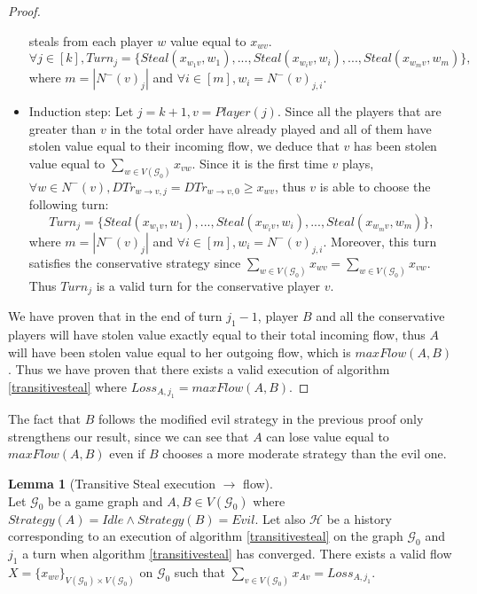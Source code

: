 \documentclass[11pt]{article}
\theoremstyle{definition}
\theoremstyle{corollary}
\theoremstyle{lemma}
\newtheorem{lemma}{Lemma}[section]
\begin{document}
\begin{proof}
\begin{itemize}
          steals from each player $w$ value equal to $x_{wv}$. $$\forall j \in [k], Turn_j = \{Steal(x_{w_1v}, w_1), ...,
          Steal(x_{w_iv}, w_i), ..., Steal(x_{w_mv}, w_m)\},$$ where $m = |N^{-}(v)_j|$ and $\forall i \in [m], w_i =
          N^{-}(v)_{j, i}$.
          \item Induction step: Let $j = k + 1, v = Player(j)$. Since all the players that are greater than $v$ in the total
          order have already played and all of them have stolen value equal to their incoming flow, we deduce that $v$ has
          been stolen value equal to $\sum\limits_{w \in V(\mathcal{G}_0)}x_{vw}$. Since it is the first time $v$ plays,
          $\forall w \in N^{-}(v), DTr_{w \rightarrow v, j} = DTr_{w \rightarrow v, 0} \geq x_{wv}$, thus $v$ is able to
          choose the following turn: $$Turn_j = \{Steal(x_{w_1v}, w_1), ..., Steal(x_{w_iv}, w_i), ...,
          Steal(x_{w_mv}, w_m)\},$$ where $m = |N^{-}(v)_j|$ and $\forall i \in [m], w_i = N^{-}(v)_{j, i}$. Moreover, this
          turn satisfies the conservative strategy since $\sum\limits_{w \in V(\mathcal{G}_0)}x_{wv} = \sum\limits_{w \in
          V(\mathcal{G}_0)}x_{vw}$. Thus $Turn_j$ is a valid turn for the conservative player $v$.
       \end{itemize}
       We have proven that in the end of turn $j_1 - 1$, player $B$ and all the conservative players will have stolen value
       exactly equal to their total incoming flow, thus $A$ will have been stolen value equal to her outgoing flow, which is
       $maxFlow(A, B)$. Thus we have proven that there exists a valid execution of algorithm \ref{transitivesteal} where
       $Loss_{A, j_1} = maxFlow(A, B)$.
    \end{proof}
    The fact that $B$ follows the modified evil strategy in the previous proof only strengthens our result, since we can see
    that $A$ can lose value equal to $maxFlow(A, B)$ even if $B$ chooses a more moderate strategy than the evil one.
    \begin{lemma}[Transitive Steal execution $\rightarrow$ flow] \ \\
       \label{gameflow}
       Let $\mathcal{G}_0$ be a game graph and $A, B \in V(\mathcal{G}_0)$ where $Strategy(A) = Idle \wedge Strategy(B) =
       Evil$. Let also $\mathcal{H}$ be a history corresponding to an execution of algorithm \ref{transitivesteal} on the
       graph $\mathcal{G}_0$ and $j_1$ a turn when algorithm \ref{transitivesteal} has converged. There exists a valid flow
       $X = \{x_{wv}\}_{V(\mathcal{G}_0) \times V(\mathcal{G}_0)}$ on $\mathcal{G}_0$ such that
       $\sum\limits_{v \in V(\mathcal{G}_0)}x_{Av} = Loss_{A, j_1}$.
    \end{lemma}
\end{document}
